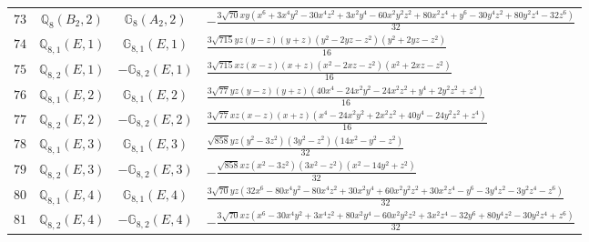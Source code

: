 \documentclass[fleqn,8pt,landscape]{jsarticle}
\begin{document}
\begin{table}[ht!]
\begin{center}
\begin{tabular}{cccl}
$ 73 $ & $ \mathbb{Q}_{8}(B_{2},2) $ & $ \mathbb{G}_{8}(A_{2},2) $ & $ - \frac{3 \sqrt{70} x y \left(x^{6} + 3 x^{4} y^{2} - 30 x^{4} z^{2} + 3 x^{2} y^{4} - 60 x^{2} y^{2} z^{2} + 80 x^{2} z^{4} + y^{6} - 30 y^{4} z^{2} + 80 y^{2} z^{4} - 32 z^{6}\right)}{32} $ \\
$ 74 $ & $ \mathbb{Q}_{8,1}(E,1) $ & $ \mathbb{G}_{8,1}(E,1) $ & $ \frac{3 \sqrt{715} y z \left(y - z\right) \left(y + z\right) \left(y^{2} - 2 y z - z^{2}\right) \left(y^{2} + 2 y z - z^{2}\right)}{16} $ \\
$ 75 $ & $ \mathbb{Q}_{8,2}(E,1) $ & $ -\mathbb{G}_{8,2}(E,1) $ & $ \frac{3 \sqrt{715} x z \left(x - z\right) \left(x + z\right) \left(x^{2} - 2 x z - z^{2}\right) \left(x^{2} + 2 x z - z^{2}\right)}{16} $ \\
$ 76 $ & $ \mathbb{Q}_{8,1}(E,2) $ & $ \mathbb{G}_{8,1}(E,2) $ & $ \frac{3 \sqrt{77} y z \left(y - z\right) \left(y + z\right) \left(40 x^{4} - 24 x^{2} y^{2} - 24 x^{2} z^{2} + y^{4} + 2 y^{2} z^{2} + z^{4}\right)}{16} $ \\
$ 77 $ & $ \mathbb{Q}_{8,2}(E,2) $ & $ -\mathbb{G}_{8,2}(E,2) $ & $ \frac{3 \sqrt{77} x z \left(x - z\right) \left(x + z\right) \left(x^{4} - 24 x^{2} y^{2} + 2 x^{2} z^{2} + 40 y^{4} - 24 y^{2} z^{2} + z^{4}\right)}{16} $ \\
$ 78 $ & $ \mathbb{Q}_{8,1}(E,3) $ & $ \mathbb{G}_{8,1}(E,3) $ & $ \frac{\sqrt{858} y z \left(y^{2} - 3 z^{2}\right) \left(3 y^{2} - z^{2}\right) \left(14 x^{2} - y^{2} - z^{2}\right)}{32} $ \\
$ 79 $ & $ \mathbb{Q}_{8,2}(E,3) $ & $ -\mathbb{G}_{8,2}(E,3) $ & $ - \frac{\sqrt{858} x z \left(x^{2} - 3 z^{2}\right) \left(3 x^{2} - z^{2}\right) \left(x^{2} - 14 y^{2} + z^{2}\right)}{32} $ \\
$ 80 $ & $ \mathbb{Q}_{8,1}(E,4) $ & $ \mathbb{G}_{8,1}(E,4) $ & $ \frac{3 \sqrt{70} y z \left(32 x^{6} - 80 x^{4} y^{2} - 80 x^{4} z^{2} + 30 x^{2} y^{4} + 60 x^{2} y^{2} z^{2} + 30 x^{2} z^{4} - y^{6} - 3 y^{4} z^{2} - 3 y^{2} z^{4} - z^{6}\right)}{32} $ \\
$ 81 $ & $ \mathbb{Q}_{8,2}(E,4) $ & $ -\mathbb{G}_{8,2}(E,4) $ & $ - \frac{3 \sqrt{70} x z \left(x^{6} - 30 x^{4} y^{2} + 3 x^{4} z^{2} + 80 x^{2} y^{4} - 60 x^{2} y^{2} z^{2} + 3 x^{2} z^{4} - 32 y^{6} + 80 y^{4} z^{2} - 30 y^{2} z^{4} + z^{6}\right)}{32} $ \\
 \hline \hline
\end{tabular}
\end{center}
\end{table}
\end{document}
